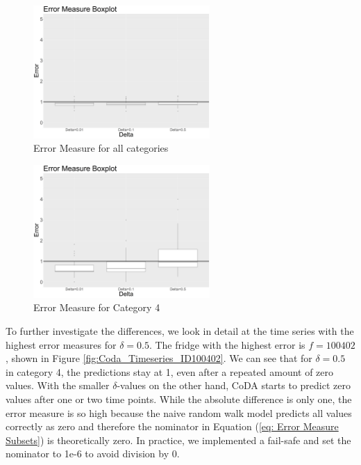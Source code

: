 \begin{figure}[htbp]
	\centering
		\includegraphics[width=0.6\textwidth]{Graphiken/ErrorMeasureCoDA_Box_all__Variation_dL.png}
	\caption{Error Measure for all categories}
	\label{fig:ErrorMeasureCoDA_Box_all__Variation_dL}
\end{figure}

\begin{figure}[htbp]
	\centering
		\includegraphics[width=0.6\textwidth]{Graphiken/ErrorMeasureCoDA_Box_all__Variation_dLcat4.png}
	\caption{Error Measure for Category 4}
	\label{fig:ErrorMeasureCoDA_Box_all__Variation_dLcat4}
\end{figure}



To further investigate the differences, we look in detail at the time series with the highest error measures for $\delta=0.5$. The fridge with the highest error is $f=100402$, shown in Figure \ref{fig:Coda_Timeseries_ID100402}. We can see that for $\delta=0.5$ in category 4, the predictions stay at 1, even after a repeated amount of zero values. With the smaller $\delta$-values on the other hand, CoDA starts to predict zero values after one or two time points. While the absolute difference is only one, the error measure is so high because the naive random walk model predicts all values correctly as zero and therefore the nominator in Equation (\ref{eq: Error Measure Subsets}) is theoretically zero. In practice, we implemented a fail-safe and set the nominator to 1e-6 to avoid division by 0. 



